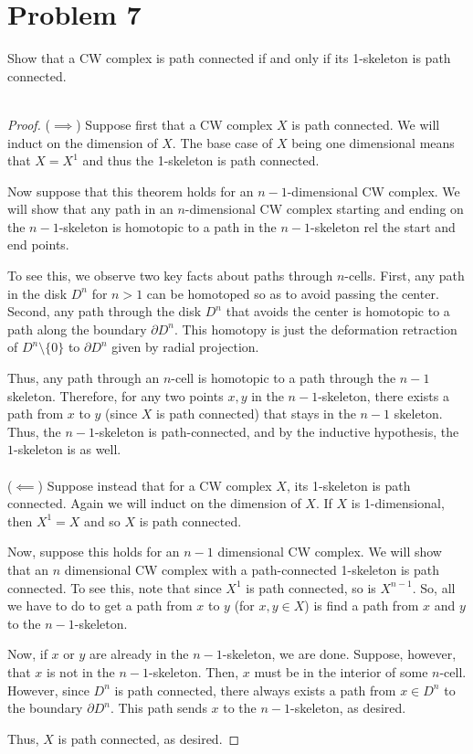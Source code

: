 \documentclass[fontsize=11pt]{scrartcl} %
\numberwithin{equation}{section} %
\numberwithin{figure}{section} %
\numberwithin{table}{section} %
\begin{document}
\section*{Problem 7}
Show that a CW complex is path connected if and only if its 1-skeleton is path
connected.
\\
\\
\begin{proof}
    ($\implies$)
    Suppose first that a CW complex $X$ is path connected. We will induct on the
    dimension of $X$. The base case of $X$ being one dimensional means that
    $X=X^1$ and thus the 1-skeleton is path connected.

    Now suppose that this theorem holds for an $n-1$-dimensional CW complex. We
    will show that any path in an $n$-dimensional CW complex starting and ending
    on the $n-1$-skeleton is homotopic to a path in the $n-1$-skeleton rel the
    start and end points.

    To see this, we observe two key facts about paths through $n$-cells. First,
    any path in the disk $D^n$ for $n>1$ can be homotoped so as to avoid passing the
    center. Second, any path through the disk $D^n$ that avoids the center is
    homotopic to a path along the boundary $\partial D^n$. This homotopy is just
    the deformation retraction of $D^n\setminus\{0\}$ to $\partial D^n$ given by
    radial projection. 

    Thus, any path through an $n$-cell is homotopic to a path through the $n-1$
    skeleton. Therefore, for any two points $x,y$ in the $n-1$-skeleton, there exists
    a path from $x$ to $y$ (since $X$ is path connected) that stays in the $n-1$
    skeleton. Thus, the $n-1$-skeleton is path-connected, and by the inductive
    hypothesis, the $1$-skeleton is as well.
    \\
    \\
    ($\impliedby$)
    Suppose instead that for a CW complex $X$, its 1-skeleton is path connected.
    Again we will induct on the dimension of $X$. If $X$ is 1-dimensional, then
    $X^1=X$ and so $X$ is path connected.

    Now, suppose this holds for an $n-1$ dimensional CW complex. We will show
    that an $n$ dimensional CW complex with a path-connected 1-skeleton is path
    connected. To see this, note that since $X^1$ is path connected, so is
    $X^{n-1}$. So, all we have to do to get a path from $x$ to $y$ (for $x,y\in
    X$) is find a path from $x$ and $y$ to the $n-1$-skeleton.

    Now, if $x$ or $y$ are already in the $n-1$-skeleton, we are done. Suppose,
    however, that $x$ is not in the $n-1$-skeleton. Then, $x$ must be in the
    interior of some $n$-cell. However, since $D^n$ is path connected, there
    always exists a path from $x\in D^n$ to the boundary $\partial D^n$. This
    path sends $x$ to the $n-1$-skeleton, as desired.

    Thus, $X$ is path connected, as desired.
\end{proof}
\end{document}
